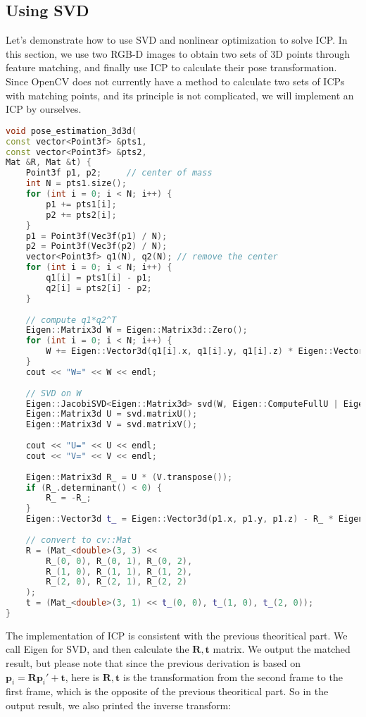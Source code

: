 \subsection{Using SVD}
Let's demonstrate how to use SVD and nonlinear optimization to solve ICP. In this section, we use two RGB-D images to obtain two sets of 3D points through feature matching, and finally use ICP to calculate their pose transformation. Since OpenCV does not currently have a method to calculate two sets of ICPs with matching points, and its principle is not complicated, we will implement an ICP by ourselves.
\begin{lstlisting}[language=c++,caption=slambook2/ch7/pose\_estimation\_3d3d.cpp（片段）]
void pose_estimation_3d3d(
const vector<Point3f> &pts1,
const vector<Point3f> &pts2,
Mat &R, Mat &t) {
	Point3f p1, p2;     // center of mass
	int N = pts1.size();
	for (int i = 0; i < N; i++) {
		p1 += pts1[i];
		p2 += pts2[i];
	}
	p1 = Point3f(Vec3f(p1) / N);
	p2 = Point3f(Vec3f(p2) / N);
	vector<Point3f> q1(N), q2(N); // remove the center
	for (int i = 0; i < N; i++) {
		q1[i] = pts1[i] - p1;
		q2[i] = pts2[i] - p2;
	}
	
	// compute q1*q2^T
	Eigen::Matrix3d W = Eigen::Matrix3d::Zero();
	for (int i = 0; i < N; i++) {
		W += Eigen::Vector3d(q1[i].x, q1[i].y, q1[i].z) * Eigen::Vector3d(q2[i].x, q2[i].y, q2[i].z).transpose();
	}
	cout << "W=" << W << endl;
	
	// SVD on W
	Eigen::JacobiSVD<Eigen::Matrix3d> svd(W, Eigen::ComputeFullU | Eigen::ComputeFullV);
	Eigen::Matrix3d U = svd.matrixU();
	Eigen::Matrix3d V = svd.matrixV();
	
	cout << "U=" << U << endl;
	cout << "V=" << V << endl;
	
	Eigen::Matrix3d R_ = U * (V.transpose());
	if (R_.determinant() < 0) {
		R_ = -R_;
	}
	Eigen::Vector3d t_ = Eigen::Vector3d(p1.x, p1.y, p1.z) - R_ * Eigen::Vector3d(p2.x, p2.y, p2.z);
	
	// convert to cv::Mat
	R = (Mat_<double>(3, 3) <<
		R_(0, 0), R_(0, 1), R_(0, 2),
		R_(1, 0), R_(1, 1), R_(1, 2),
		R_(2, 0), R_(2, 1), R_(2, 2)
	);
	t = (Mat_<double>(3, 1) << t_(0, 0), t_(1, 0), t_(2, 0));
}
\end{lstlisting}

The implementation of ICP is consistent with the previous theoritical part. We call Eigen for SVD, and then calculate the $\mathbf{R}, \mathbf{t}$ matrix. We output the matched result, but please note that since the previous derivation is based on $\mathbf{p}_i = \mathbf{R} \mathbf{p}_i' + \mathbf{t}$, here is $\mathbf{R}, \mathbf{t}$ is the transformation from the second frame to the first frame, which is the opposite of the previous theoritical part. So in the output result, we also printed the inverse transform:

